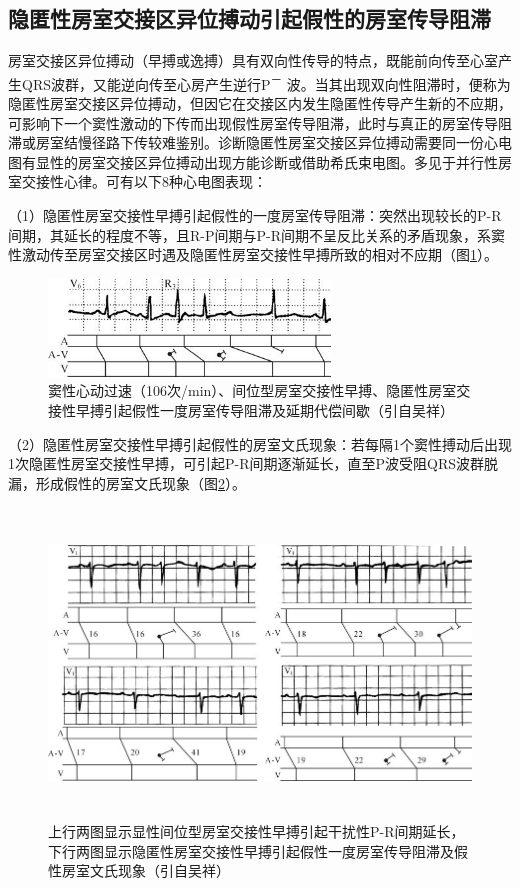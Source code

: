 \protect\hypertarget{text00042.htmlux5cux23subid459}{}{}

\subsection{隐匿性房室交接区异位搏动引起假性的房室传导阻滞}

房室交接区异位搏动（早搏或逸搏）具有双向性传导的特点，既能前向传至心室产生QRS波群，又能逆向传至心房产生逆行P\textsuperscript{－}
波。当其出现双向性阻滞时，便称为隐匿性房室交接区异位搏动，但因它在交接区内发生隐匿性传导产生新的不应期，可影响下一个窦性激动的下传而出现假性房室传导阻滞，此时与真正的房室传导阻滞或房室结慢径路下传较难鉴别。诊断隐匿性房室交接区异位搏动需要同一份心电图有显性的房室交接区异位搏动出现方能诊断或借助希氏束电图。多见于并行性房室交接性心律。可有以下8种心电图表现：

（1）隐匿性房室交接性早搏引起假性的一度房室传导阻滞：突然出现较长的P-R间期，其延长的程度不等，且R-P间期与P-R间期不呈反比关系的矛盾现象，系窦性激动传至房室交接区时遇及隐匿性房室交接性早搏所致的相对不应期（图\ref{fig35-13}）。

\begin{figure}[!htbp]
 \centering
 \includegraphics[width=2.94792in,height=1.02083in]{./images/Image00566.jpg}
 \captionsetup{justification=centering}
 \caption{窦性心动过速（106次/min）、间位型房室交接性早搏、隐匿性房室交接性早搏引起假性一度房室传导阻滞及延期代偿间歇（引自吴祥）}
 \label{fig35-13}
  \end{figure} 

（2）隐匿性房室交接性早搏引起假性的房室文氏现象：若每隔1个窦性搏动后出现1次隐匿性房室交接性早搏，可引起P-R间期逐渐延长，直至P波受阻QRS波群脱漏，形成假性的房室文氏现象（图\ref{fig35-14}）。

\begin{figure}[!htbp]
 \centering
 \includegraphics[width=5.78125in,height=3.22917in]{./images/Image00567.jpg}
 \captionsetup{justification=centering}
 \caption{上行两图显示显性间位型房室交接性早搏引起干扰性P-R间期延长，下行两图显示隐匿性房室交接性早搏引起假性一度房室传导阻滞及假性房室文氏现象（引自吴祥）}
 \label{fig35-14}
  \end{figure} 

